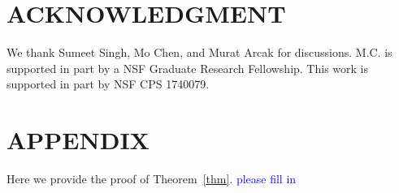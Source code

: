 \documentclass[letterpaper, 10 pt, conference]{ieeeconf}  %
\begin{document}



\section*{ACKNOWLEDGMENT}
We thank Sumeet Singh, Mo Chen, and Murat Arcak for discussions.
M.C. is supported in part by a NSF Graduate Research Fellowship.
This work is supported in part by NSF CPS 1740079.

\section*{APPENDIX}\label{appendix}
Here we provide the proof of Theorem~\ref{thm}. \textcolor{blue}{please fill in}

\addtolength{\textheight}{-2cm}   %


\end{document}
